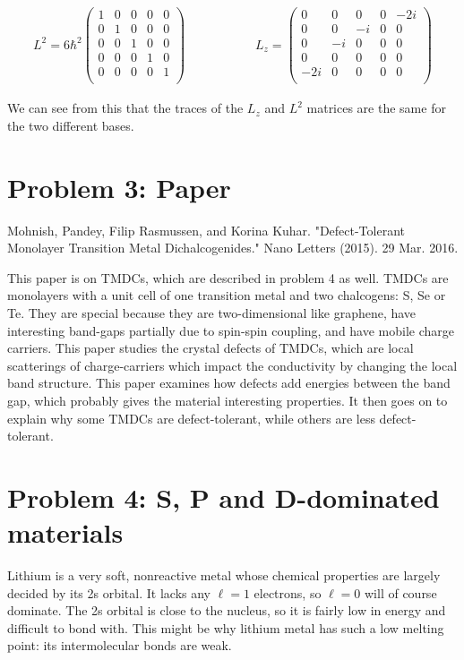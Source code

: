 \documentclass[10pt]{article} %
\begin{document}
\begin{align*}
  L^2 =
  6\hbar^2\begin{pmatrix}
    1 & 0 & 0 & 0 & 0\\
    0 & 1 & 0 & 0 & 0\\
    0 & 0 & 1 & 0 & 0\\
    0 & 0 & 0 & 1 & 0\\
    0 & 0 & 0 & 0 & 1\\
  \end{pmatrix}&
  \hspace{2cm}
  L_z =
  \begin{pmatrix}
   0 & 0 & 0 & 0 & -2i\\
   0 & 0 & -i & 0 & 0\\
   0 & -i & 0 & 0 & 0\\
   0 & 0 & 0 & 0 & 0\\
   -2i & 0 & 0 & 0 & 0\\
  \end{pmatrix}
\end{align*}

We can see from this that the traces of the $L_z$ and $L^2$ matrices are the same
for the two different bases.\\

\section{Problem 3: Paper}
Mohnish, Pandey, Filip Rasmussen, and Korina Kuhar. "Defect-Tolerant Monolayer
Transition Metal Dichalcogenides." Nano Letters (2015). 29 Mar. 2016.

This paper is on TMDCs, which are described in problem 4 as well. TMDCs are
monolayers with a unit cell of one transition metal and two chalcogens: S, Se
or Te. They are special because they are two-dimensional like graphene, have
interesting band-gaps partially due to spin-spin coupling, and have mobile
charge carriers. This paper studies the crystal defects of TMDCs, which are local
scatterings of charge-carriers which impact the conductivity by changing the
local band structure. This paper examines how defects add energies between
the band gap, which probably gives the material interesting properties. It then
goes on to explain why some TMDCs are defect-tolerant, while others are less
defect-tolerant.\\

\section{Problem 4: S, P and D-dominated materials}
Lithium is a very soft, nonreactive metal whose chemical properties are largely
decided by its 2s orbital. It lacks any $\ell=1$ electrons, so $\ell=0$ will of
course dominate. The 2s orbital is close to the nucleus, so it is fairly low
in energy and difficult to bond with. This might be why lithium metal has such
a low melting point: its intermolecular bonds are weak.\\
\end{document}
